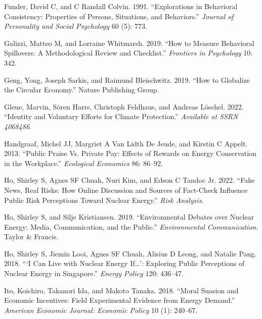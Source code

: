 \documentclass[
  11pt,
  captions=heading]{scrreport}
\newlength{\cslhangindent}
\newlength{\cslentryspacingunit} %
\newenvironment{CSLReferences}[2] %
 {%
  \setlength{\parindent}{0pt}
  \ifodd #1
  \let\oldpar\par
  \def\par{\hangindent=\cslhangindent\oldpar}
  \fi
  \setlength{\parskip}{#2\cslentryspacingunit}
 }%
 {}
\begin{document}
\begin{CSLReferences}{1}{0}
\leavevmode{}%
Funder, David C, and C Randall Colvin. 1991. {``Explorations in
Behavioral Consistency: Properties of Persons, Situations, and
Behaviors.''} \emph{Journal of Personality and Social Psychology} 60
(5): 773.

\leavevmode{}%
Galizzi, Matteo M, and Lorraine Whitmarsh. 2019. {``How to Measure
Behavioral Spillovers: A Methodological Review and Checklist.''}
\emph{Frontiers in Psychology} 10: 342.

\leavevmode{}%
Geng, Yong, Joseph Sarkis, and Raimund Bleischwitz. 2019. {``How to
Globalize the Circular Economy.''} Nature Publishing Group.

\leavevmode{}%
Gleue, Marvin, Sören Harrs, Christoph Feldhaus, and Andreas Löschel.
2022. {``Identity and Voluntary Efforts for Climate Protection.''}
\emph{Available at SSRN 4068486}.

\leavevmode{}%
Handgraaf, Michel JJ, Margriet A Van Lidth De Jeude, and Kirstin C
Appelt. 2013. {``Public Praise Vs. Private Pay: Effects of Rewards on
Energy Conservation in the Workplace.''} \emph{Ecological Economics} 86:
86--92.

\leavevmode{}%
Ho, Shirley S, Agnes SF Chuah, Nuri Kim, and Edson C Tandoc Jr. 2022.
{``Fake News, Real Risks: How Online Discussion and Sources of
Fact-Check Influence Public Risk Perceptions Toward Nuclear Energy.''}
\emph{Risk Analysis}.

\leavevmode{}%
Ho, Shirley S, and Silje Kristiansen. 2019. {``Environmental Debates
over Nuclear Energy: Media, Communication, and the Public.''}
\emph{Environmental Communication}. Taylor \& Francis.

\leavevmode{}%
Ho, Shirley S, Jiemin Looi, Agnes SF Chuah, Alisius D Leong, and Natalie
Pang. 2018. {``{`I Can Live with Nuclear Energy If{\ldots{}}'}:
Exploring Public Perceptions of Nuclear Energy in Singapore.''}
\emph{Energy Policy} 120: 436--47.

\leavevmode{}%
Ito, Koichiro, Takanori Ida, and Makoto Tanaka. 2018. {``Moral Suasion
and Economic Incentives: Field Experimental Evidence from Energy
Demand.''} \emph{American Economic Journal: Economic Policy} 10 (1):
240--67.


\end{CSLReferences}
\end{document}
